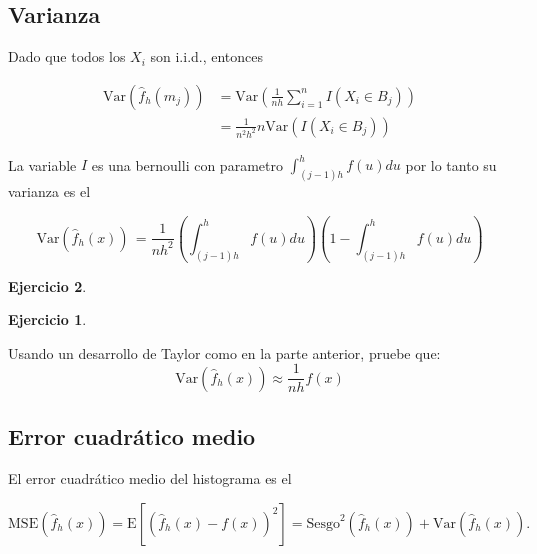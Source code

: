 \documentclass[
  12pt,
]{book}
\theoremstyle{definition}
\theoremstyle{definition}
\theoremstyle{definition}
\newtheorem{exercise}{Ejercicio}[chapter]
\theoremstyle{remark}
\begin{document}
\hypertarget{varianza}{%
\subsection{Varianza}\label{varianza}}

Dado que todos los \(X_i\) son i.i.d., entonces

\begin{align*}
\mathrm{Var}\left( \hat{f}_h(m_j)\right) & =
\mathrm{Var}\left( \frac{1}{nh} \sum_{i = 1}^{n} I(X_i \in B_j)\right)                                  \\
& = \frac{1}{n^2h^2} n\mathrm{Var}\left( I(X_i \in B_j)\right)
\end{align*}

La variable \(I\) es una bernoulli con parametro \(\int_{(j - 1)h}^{h} f(u)du\) por lo tanto su varianza es el

\begin{equation*}
\mathrm{Var}\left( \hat{f}_h(x)\right)\, =
\frac{1}{nh^2} \left(\int_{(j - 1)h}^{h} f(u)du \right)\left( 1 -\int_{(j - 1)h}^{h} f(u)du \right)
\end{equation*}

\begin{exercise}
\begin{exercise}
\protect\hypertarget{exr:unlabeled-div-1}{}\label{exr:unlabeled-div-1}

\protect\hypertarget{exr:unnamed-chunk-3}{}{\label{exr:unnamed-chunk-3} }Usando un desarrollo de Taylor como en la parte anterior, pruebe que:
\begin{equation*}
\mathrm{Var}\left( \hat{f}_h(x)\right)\approx
\frac{1}{nh} f(x)
\end{equation*}

\end{exercise}
\end{exercise}

\hypertarget{error-cuadruxe1tico-medio}{%
\subsection{Error cuadrático medio}\label{error-cuadruxe1tico-medio}}

El error cuadrático medio del histograma es el

\begin{equation*}
\mathrm{MSE}\left( \hat{f}_h(x)\right) =
\mathrm{E}\left[\left(\hat{f}_h(x) - f(x)\right)^2\right] = \mathrm{Sesgo}^2\left( \hat{f}_h(x)\right) + \mathrm{Var}\left( \hat{f}_h(x)\right).
\end{equation*}
\end{document}
